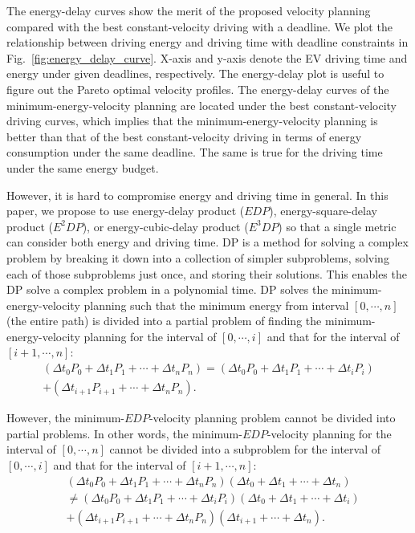 \documentclass{IEEEtran}
\begin{document}
The energy-delay curves show the merit of the proposed velocity planning compared with the best constant-velocity driving with a deadline. We plot the relationship between driving energy and driving time with deadline constraints in Fig.~\ref{fig:energy_delay_curve}. X-axis and y-axis denote the EV driving time and energy under given deadlines, respectively. The energy-delay plot is useful to figure out the Pareto optimal velocity profiles. The energy-delay curves of the minimum-energy-velocity planning are located under the best constant-velocity driving curves, which implies that the minimum-energy-velocity planning is better than that of the best constant-velocity driving in terms of energy consumption under the same deadline. The same is true for the driving time under the same energy budget.

However, it is hard to compromise energy and driving time in general. In this paper, we propose to use energy-delay product ($EDP$), energy-square-delay product ($E^2DP$), or energy-cubic-delay product ($E^3DP$) so that a single metric can consider both energy and driving time. 
%
DP is a method for solving a complex problem by breaking it down into a collection of simpler subproblems, solving each of those subproblems just once, and storing their solutions. This enables the DP solve a complex problem in a polynomial time. DP solves the minimum-energy-velocity planning such that the minimum energy from interval $[0,\cdots,n]$ (the entire path) is divided into a partial problem of finding the minimum-energy-velocity planning for the interval of $[0, \cdots, i]$ and that for the interval of  $[i+1, \cdots, n]$:
%
\begin{align}
 (\Delta t_0 P_0 + \Delta t_1 P_1 + \cdots + \Delta t_n P_n)
 = (\Delta t_0 P_0 + \Delta t_1 P_1 + \cdots + \Delta t_i P_i) \nonumber \\
 + (\Delta t_{i+1} P_{i+1} + \cdots + \Delta t_n P_n).
\end{align}

However, the minimum-$EDP$-velocity planning problem cannot be divided into partial problems. In other words, the minimum-$EDP$-velocity planning for the interval of $[0, \cdots, n]$ cannot be divided into a subproblem for the interval of $[0, \cdots,  i]$ and that for the interval of $[i+1,\cdots, n]$:
%
\begin{align}
&(\Delta t_0 P_0 + \Delta t_1 P_1 + \cdots + \Delta t_n P_n)(\Delta t_0 + \Delta t_1 + \cdots + \Delta t_n) \nonumber \\ 
&\neq (\Delta t_0 P_0 + \Delta t_1 P_1 + \cdots + \Delta t_i P_i)(\Delta t_0 + \Delta t_1 + \cdots + \Delta t_i) \nonumber \\
&+ (\Delta t_{i+1} P_{i+1} + \cdots + \Delta t_n P_n)(\Delta t_{i+1} + \cdots + \Delta t_n).
\end{align} 
\end{document}
